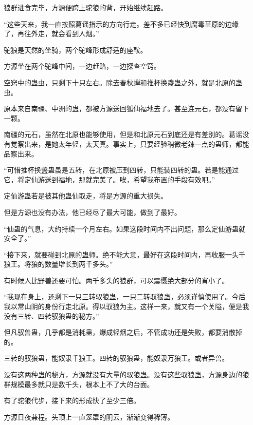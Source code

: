 
\begin{this_body}



狼群进食完毕，方源便跨上驼狼的背，开始继续赶路。

“这些天来，我一直按照葛谣指示的方向行走。差不多已经快到腐毒草原的边缘了，再往外走，就会看到人烟。”

驼狼是天然的坐骑，两个驼峰形成舒适的座鞍。

方源坐在两个驼峰中间，一边赶路，一边探查空窍。

空窍中的蛊虫，只剩下十只左右。除去春秋蝉和推杯换盏蛊之外，就是北原的蛊虫。

原本来自南疆、中洲的蛊，都被方源送回狐仙福地去了。甚至连元石，都没有留下一颗。

南疆的元石，虽然在北原也能够使用，但是和北原元石到底还是有差别的。葛谣没有觉察出来，是她太年轻，太天真。事实上，只要经验稍微老辣一点的蛊师，都能品察出来。

“可惜推杯换盏蛊虽是五转，在北原被压到四转，只能装四转的蛊。若是能通过它，将定仙游送到福地，那就完美了。唉，希望我布置的手段有效吧。”

定仙游蛊若是被其他蛊仙取走，将是方源的重大损失。

但是方源也没有办法，他已经尽了最大可能，做到了最好。

“仙蛊的气息，大约持续一个月左右。如果这段时间内不出问题，那么定仙游蛊就安全了。”

“接下来，就要碰到北原的蛊师。绝不能大意，最好在这段时间内，再收服一头千狼王。将狼的数量增长到两千多头。”

有时候人比野兽还要可怕。两千多头的狼群，可以震慑绝大部分的宵小了。

“我现在身上，还剩下一只三转驭狼蛊，一只二转驭狼蛊，必须谨慎使用了。今后我以常山阴的身份行走北原。得以驭狼为主。这样一来，就又有一个关隘，便是我没有三转、四转驭狼蛊的秘方。”

但凡驭兽蛊，几乎都是消耗蛊，爆成轻烟之后，不管成功还是失败，都要消散掉的。

三转的驭狼蛊，能奴隶千狼王。四转的驭狼蛊，能奴隶万狼王。或者异兽。

没有这两种蛊的秘方，方源就没有大量的驭狼蛊。没有这些驭狼蛊，方源身边的狼群规模最多就只是数千头，根本上不了大的台面。

有了驼狼代步，接下来的形成快了至少三倍。

方源日夜兼程。头顶上一直笼罩的阴云，渐渐变得稀薄。


\end{this_body}

